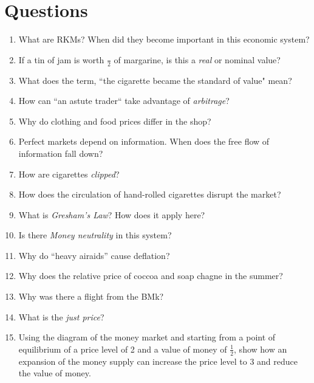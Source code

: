\documentclass{article}
\begin{document}
\section{Questions}
\begin{enumerate}
\item What are RKMs? When did they become important in this economic system? 

\item If a tin of jam is worth $\frac{}{2}$ of margarine, is this a \emph{real} or {nominal} value? 

\item What does the term, ``the cigarette became the standard of value" mean? 

\item How can ``an astute trader`` take advantage of \emph{arbitrage}? 

\item Why do clothing and food prices differ in the shop? 

\item Perfect markets depend on information. When does the free flow of information fall down? 

\item How are cigarettes \emph{clipped}?

\item How does the circulation of hand-rolled cigarettes disrupt the market? 

\item What is \emph{Gresham's Law}?  How does it apply here? 

\item Is there \emph{Money neutrality} in this system? 

\item Why do ``heavy airaids'' cause deflation? 

\item Why does the relative price of coccoa and soap chagne in the summer? 

\item Why was there a flight from the BMk?

\item What is the \emph{just price}?

\item Using the diagram of the money market and starting from a point of equilibrium of a price level of 2 and a value of money of $\frac{1}{2}$, show how an expansion of the money supply can increase the price level to 3 and reduce the value of money. 


\end{enumerate}
\end{document}
